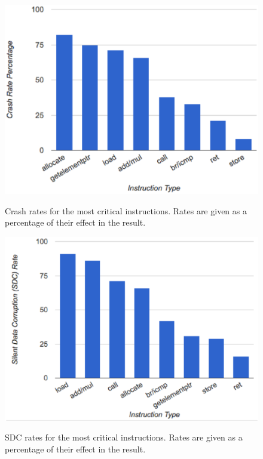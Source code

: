 \begin{figure}[!t]
\begin{center}
\label{fig:plan_9}\includegraphics[scale=0.39]{./figures/crash_type_2.eps}
\end{center}
\caption{Crash rates for the most critical instructions. Rates are given as a percentage of their effect in the result.}
\label{fig:plan_9}
\end{figure}

\begin{figure}[!t]
\begin{center}
\label{fig:plan_10}\includegraphics[scale=0.39]{./figures/sdc_type_2.eps}
\end{center}
\caption{SDC rates for the most critical instructions. Rates are given as a percentage of their effect in the result.}
\label{fig:plan_10}
\end{figure}




